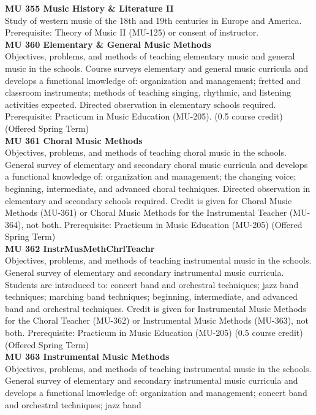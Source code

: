 \documentclass[
  letterpaper,
]{scrbook}
\begin{document}
\textbf{MU 355 Music History \& Literature II}\\
Study of western music of the 18th and 19th centuries in Europe and
America. Prerequisite: Theory of Music II (MU-125) or consent of
instructor.\\
\textbf{MU 360 Elementary \& General Music Methods}\\
Objectives, problems, and methods of teaching elementary music and
general music in the schools. Course surveys elementary and general
music curricula and develops a functional knowledge of: organization and
management; fretted and classroom instruments; methods of teaching
singing, rhythmic, and listening activities expected. Directed
observation in elementary schools required. Prerequisite: Practicum in
Music Education (MU-205). (0.5 course credit) (Offered Spring Term)\\
\textbf{MU 361 Choral Music Methods}\\
Objectives, problems, and methods of teaching choral music in the
schools. General survey of elementary and secondary choral music
curricula and develops a functional knowledge of: organization and
management; the changing voice; beginning, intermediate, and advanced
choral techniques. Directed observation in elementary and secondary
schools required. Credit is given for Choral Music Methods (MU-361) or
Choral Music Methods for the Instrumental Teacher (MU-364), not both.
Prerequisite: Practicum in Music Education (MU-205) (Offered Spring
Term)\\
\textbf{MU 362 InstrMusMethChrlTeachr}\\
Objectives, problems, and methods of teaching instrumental music in the
schools. General survey of elementary and secondary instrumental music
curricula. Students are introduced to: concert band and orchestral
techniques; jazz band techniques; marching band techniques; beginning,
intermediate, and advanced band and orchestral techniques. Credit is
given for Instrumental Music Methods for the Choral Teacher (MU-362) or
Instrumental Music Methods (MU-363), not both. Prerequisite: Practicum
in Music Education (MU-205) (0.5 course credit) (Offered Spring Term)\\
\textbf{MU 363 Instrumental Music Methods}\\
Objectives, problems, and methods of teaching instrumental music in the
schools. General survey of elementary and secondary instrumental music
curricula and develops a functional knowledge of: organization and
management; concert band and orchestral techniques; jazz band
\end{document}

